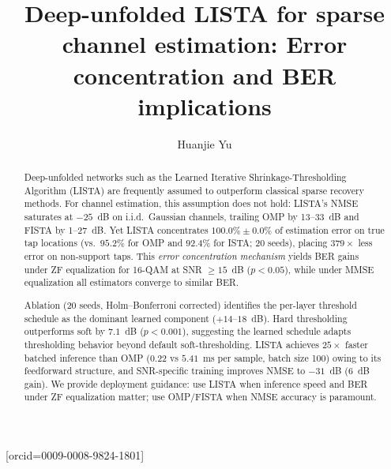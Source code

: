 \documentclass[a4paper,fleqn]{cas-sc}
\begin{document}
\let\WriteBookmarks\relax
\def\floatpagepagefraction{1}
\def\textpagefraction{.001}



\title [mode = title]{Deep-unfolded LISTA for sparse channel estimation: Error concentration and BER implications}

\author[1]{Huanjie Yu}[orcid=0009-0008-9824-1801]
\cormark[1]
\fnmark[1]



\begin{abstract}
Deep-unfolded networks such as the Learned Iterative Shrinkage-Thresholding Algorithm (LISTA) are frequently assumed to outperform classical sparse recovery methods. For channel estimation, this assumption does not hold: LISTA's NMSE saturates at $-25$~dB on i.i.d.~Gaussian channels, trailing OMP by 13--33~dB and FISTA by 1--27~dB. Yet LISTA concentrates $100.0\% \pm 0.0\%$ of estimation error on true tap locations (vs.~$95.2\%$ for OMP and $92.4\%$ for ISTA; 20 seeds), placing $379\times$ less error on non-support taps. This \emph{error concentration mechanism} yields BER gains under ZF equalization for 16-QAM at SNR $\geq 15$~dB ($p < 0.05$), while under MMSE equalization all estimators converge to similar BER.

Ablation (20 seeds, Holm--Bonferroni corrected) identifies the per-layer threshold schedule as the dominant learned component ($+14$--$18$~dB). Hard thresholding outperforms soft by $7.1$~dB ($p < 0.001$), suggesting the learned schedule adapts thresholding behavior beyond default soft-thresholding. LISTA achieves $25\times$ faster batched inference than OMP ($0.22$ vs $5.41$~ms per sample, batch size 100) owing to its feedforward structure, and SNR-specific training improves NMSE to $-31$~dB ($6$~dB gain). We provide deployment guidance: use LISTA when inference speed and BER under ZF equalization matter; use OMP/FISTA when NMSE accuracy is paramount.
\end{abstract}
\end{document}
